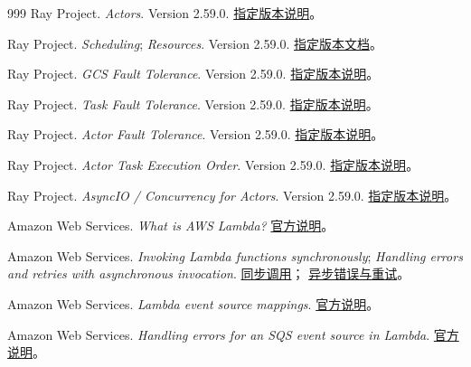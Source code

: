 \begin{thebibliography}{999}
Ray Project.
\textit{Actors}. Version 2.59.0.
\href{https://github.com/ray-project/ray/blob/ray-2.59.0/doc/source/ray-core/actors.rst}{指定版本说明}。

Ray Project.
\textit{Scheduling}; \textit{Resources}. Version 2.59.0.
\href{https://github.com/ray-project/ray/tree/ray-2.59.0/doc/source/ray-core/scheduling}{指定版本文档}。

Ray Project.
\textit{GCS Fault Tolerance}. Version 2.59.0.
\href{https://github.com/ray-project/ray/blob/ray-2.59.0/doc/source/ray-core/fault_tolerance/gcs.rst}{指定版本说明}。

Ray Project.
\textit{Task Fault Tolerance}. Version 2.59.0.
\href{https://github.com/ray-project/ray/blob/ray-2.59.0/doc/source/ray-core/fault_tolerance/tasks.rst}{指定版本说明}。

Ray Project.
\textit{Actor Fault Tolerance}. Version 2.59.0.
\href{https://github.com/ray-project/ray/blob/ray-2.59.0/doc/source/ray-core/fault_tolerance/actors.rst}{指定版本说明}。

Ray Project.
\textit{Actor Task Execution Order}. Version 2.59.0.
\href{https://github.com/ray-project/ray/blob/ray-2.59.0/doc/source/ray-core/actors/task-orders.rst}{指定版本说明}。

Ray Project.
\textit{AsyncIO / Concurrency for Actors}. Version 2.59.0.
\href{https://github.com/ray-project/ray/blob/ray-2.59.0/doc/source/ray-core/actors/async_api.rst}{指定版本说明}。

Amazon Web Services.
\textit{What is AWS Lambda?}
\href{https://docs.aws.amazon.com/lambda/latest/dg/welcome.html}{官方说明}。

Amazon Web Services.
\textit{Invoking Lambda functions synchronously};
\textit{Handling errors and retries with asynchronous invocation}.
\href{https://docs.aws.amazon.com/lambda/latest/dg/invocation-sync.html}{同步调用}；
\href{https://docs.aws.amazon.com/lambda/latest/dg/invocation-async-error-handling.html}{异步错误与重试}。

Amazon Web Services.
\textit{Lambda event source mappings}.
\href{https://docs.aws.amazon.com/lambda/latest/dg/invocation-eventsourcemapping.html}{官方说明}。

Amazon Web Services.
\textit{Handling errors for an SQS event source in Lambda}.
\href{https://docs.aws.amazon.com/lambda/latest/dg/services-sqs-errorhandling.html}{官方说明}。


\end{thebibliography}
